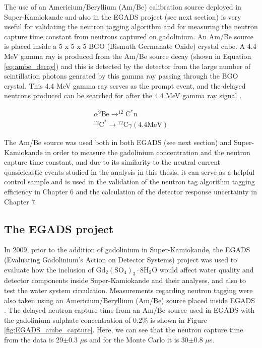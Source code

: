 The use of an Americium/Beryllium (Am/Be) calibration source deployed in Super-Kamiokande and also in the EGADS project (see next section) is very useful for validating the neutron tagging algorithm and for measuring the neutron capture time constant from neutrons captured on gadolinium. An Am/Be source is placed inside a 5 x 5 x 5 BGO (Bismuth Germanate Oxide) crystal cube. A 4.4 MeV gamma ray is produced from the Am/Be source decay (shown in Equation \ref{eq:ambe_decay}) and this is detected by the detector from the large number of scintillation photons genrated by this gamma ray passing through the BGO crystal. This 4.4 MeV gamma ray serves as the prompt event, and the delayed neutrons produced can be searched for after the 4.4 MeV gamma ray signal \cite{abe2022neutron}.

\begin{equation}
\begin{array}{c}
\alpha^{9} \mathrm{Be} \longrightarrow^{12} \mathrm{C}^{*} \mathrm{n} \\
{ }^{12} \mathrm{C}^{*} \longrightarrow{ }^{12} \mathrm{C} \gamma(4.4 \mathrm{MeV})
\end{array}
\label{eq:ambe_decay}
\end{equation}

The Am/Be source was used both in both EGADS (see next section) and Super-Kamiokande in order to measure the gadolinium concentration and the neutron capture time constant, and due to its similarity to the neutral current quasieleastic events studied in the analysis in this thesis, it can serve as a helpful control sample and is used in the validation of the neutron tag algorithm tagging efficiency in Chapter 6 and the calculation of the detector response uncertainty in Chapter 7. 

\subsection{The EGADS project}

In 2009, prior to the addition of gadolinium in Super-Kamiokande, the EGADS (Evaluating Gadolinium's Action on Detector Systems) project was used to evaluate how the inclusion of $\mathrm{Gd}_{2}\left(\mathrm{SO}_{4}\right)_{3} \cdot 8 \mathrm{H}_{2} \mathrm{O}$ would affect water quality and detector components inside Super-Kamiokande and their analyses, and also to test the water system circulation. Measurements regarding neutron tagging were also taken using an Americium/Beryllium (Am/Be) source placed inside EGADS \cite{magro2015egads}.
The delayed neutron capture time from an Am/Be source used in EGADS with the gadolinium sulphate concentration of 0.2\% is shown in Figure \ref{fig:EGADS_ambe_capture}. Here, we can see that the neutron capture time from the data is 29$\pm$0.3 $\mu$s and for the Monte Carlo it is 30$\pm$0.8 $\mu$s.

